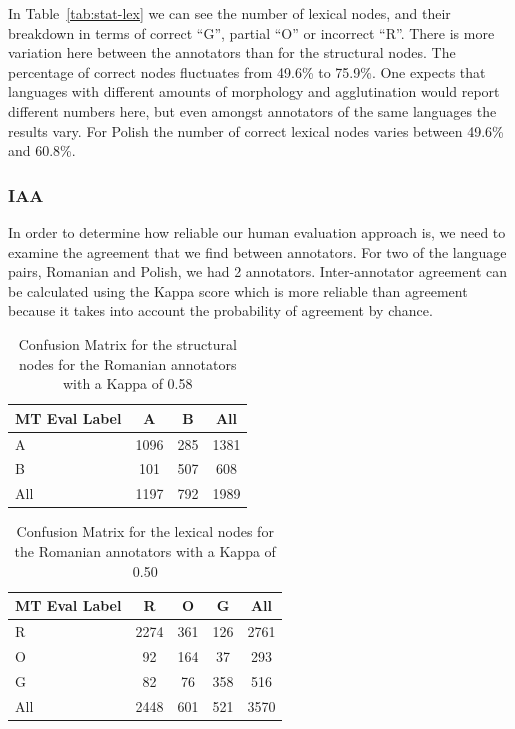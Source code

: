 \documentclass[11pt]{article}
\begin{document}
In Table~\ref{tab:stat-lex} we can see the number of lexical nodes, and their
breakdown in terms of correct  ``G'', partial ``O'' or incorrect ``R''. 
There is more variation here between the annotators than for the
structural nodes. The percentage of correct nodes fluctuates from 49.6\%
to 75.9\%. One expects that  languages with different amounts of 
morphology and agglutination would report different numbers here,
but even amongst annotators of the same languages the results vary.
For Polish the number of correct lexical 
nodes
varies between 49.6\%
and 60.8\%.

\subsubsection{IAA}

In order to determine how reliable our human evaluation approach is, we need to
examine the agreement that we find between annotators.
For two of the language pairs, Romanian and Polish, we had 2 annotators. 
 Inter-annotator agreement can be calculated 
using the Kappa score which is more reliable than agreement because it takes into
account the probability of agreement by chance. 


\begin{table}[h!]
\begin{center}
      \begin{tabular}{|l|cc|c|}
      \hline
\bf{MT Eval Label} & \bf{A} & \bf{B} & \bf{All} \\
\hline                               
    A   & 1096 &  285 & 1381\\ 
   B   & 101 & 507  & 608\\ 
   \hline
   All &  1197 &  792 & 1989\\
      \hline
    \end{tabular}
\end{center}
\normalsize
\vspace*{-3ex}
\caption{Confusion Matrix for the structural nodes for the Romanian annotators with a Kappa of 0.58
}
\label{tab:iaa-ab-ro}
\end{table}

\begin{table}[h!]
\begin{center}
      \begin{tabular}{|l|ccc|c|}
      \hline
\bf{MT Eval Label} & \bf{R} & \bf{O} & \bf{G} & \bf{All} \\
\hline                               
   R   & 2274 &  361 & 126 & 2761 \\ 
   O   & 92 & 164  & 37 & 293 \\ 
   G   & 82 & 76  & 358 & 516 \\ 
   \hline
   All &  2448 &  601 & 521 & 3570\\
      \hline
    \end{tabular}
\end{center}
\normalsize
\vspace*{-3ex}
\caption{Confusion Matrix for the lexical nodes for the Romanian annotators with a Kappa of 0.50
}
\label{tab:iaa-rgo-ro}
\end{table}
\end{document}
